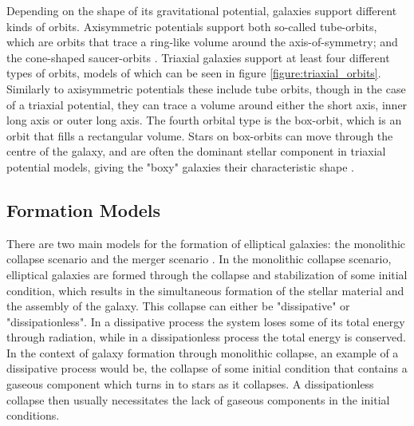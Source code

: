 \documentclass[english, oneside]{HYgradu}
\begin{document}
Depending on the shape of its gravitational potential, galaxies support different kinds of orbits. Axisymmetric potentials support both so-called tube-orbits, which are orbits that trace a ring-like volume around the axis-of-symmetry; and the cone-shaped saucer-orbits \citep{MerrittBook}. Triaxial galaxies support at least four different types of orbits, models of which can be seen in figure \ref{figure:triaxial_orbits}. Similarly to axisymmetric potentials these include tube orbits, though in the case of a triaxial potential, they can trace a volume around either the short axis, inner long axis or outer long axis. The fourth orbital type is the box-orbit, which is an orbit that fills a rectangular volume. Stars on box-orbits can move through the centre of the galaxy, and are often the dominant stellar component in triaxial potential models, giving the "boxy" galaxies their characteristic shape \citep{BinneyTremaine}.


\subsection{Formation Models}

There are two main models for the formation of elliptical galaxies: the monolithic collapse scenario and the merger scenario \citep{GalaxyFormationAndEvo2010}. In the monolithic collapse scenario, elliptical galaxies are formed through the collapse and stabilization of some initial condition, which results in the simultaneous formation of the stellar material and the assembly of the galaxy. This collapse can either be "dissipative" or "dissipationless". In a dissipative process the system loses some of its total energy through radiation, while in a dissipationless process the total energy is conserved. In the context of galaxy formation through monolithic collapse, an example of a dissipative process would be, the collapse of some initial condition that contains a gaseous component which turns in to stars as it collapses. A dissipationless collapse then usually necessitates the lack of gaseous components in the initial conditions.
\end{document}
